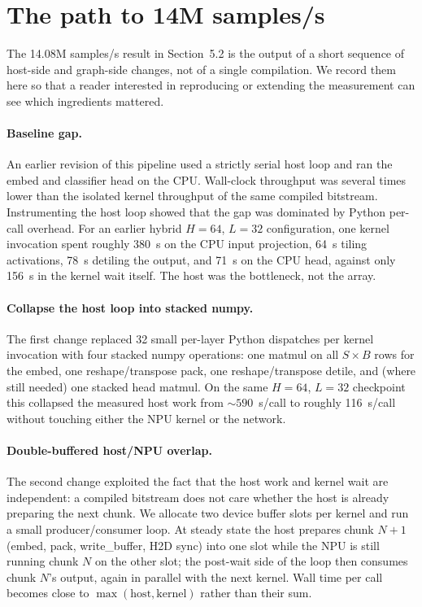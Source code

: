 \documentclass[a4paper,11pt]{article}
\begin{document}
\FloatBarrier
\clearpage
\section{The path to 14M samples/s}
\label{app:path-to-14M}

The 14.08M samples/s result in Section~5.2 is the output of a short sequence
of host-side and graph-side changes, not of a single compilation. We record
them here so that a reader interested in reproducing or extending the
measurement can see which ingredients mattered.

\paragraph{Baseline gap.} An earlier revision of this pipeline used a strictly
serial host loop and ran the embed and classifier head on the CPU. Wall-clock
throughput was several times lower than the isolated kernel throughput of the
same compiled bitstream. Instrumenting the host loop showed that the gap was
dominated by Python per-call overhead. For an earlier hybrid $H=64$, $L=32$
configuration, one kernel invocation spent roughly 380~\textmu{}s on the CPU
input projection, 64~\textmu{}s tiling activations, 78~\textmu{}s detiling the
output, and 71~\textmu{}s on the CPU head, against only 156~\textmu{}s in the
kernel wait itself. The host was the bottleneck, not the array.

\paragraph{Collapse the host loop into stacked numpy.} The first change replaced
32 small per-layer Python dispatches per kernel invocation with four stacked
numpy operations: one matmul on all $S \!\times\! B$ rows for the embed, one
reshape/transpose pack, one reshape/transpose detile, and (where still needed)
one stacked head matmul. On the same $H=64$, $L=32$ checkpoint this collapsed
the measured host work from $\sim\!590$~\textmu{}s/call to roughly
116~\textmu{}s/call without touching either the NPU kernel or the network.

\paragraph{Double-buffered host/NPU overlap.} The second change exploited the
fact that the host work and kernel wait are independent: a compiled bitstream
does not care whether the host is already preparing the next chunk. We allocate
two device buffer slots per kernel and run a small producer/consumer loop. At
steady state the host prepares chunk $N{+}1$ (embed, pack, write\_buffer, H2D
sync) into one slot while the NPU is still running chunk $N$ on the other slot;
the post-wait side of the loop then consumes chunk $N$'s output, again in
parallel with the next kernel. Wall time per call becomes close to
$\max(\text{host}, \text{kernel})$ rather than their sum.
\end{document}
